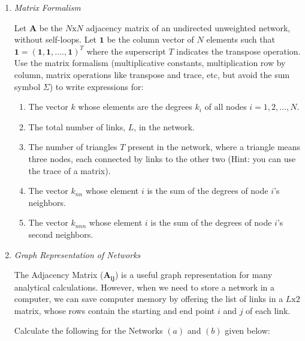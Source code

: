 \documentclass[12pt,letterpaper]{article}
\begin{document}

\bigskip
\bigskip

\begin{enumerate}

\item \textit{Matrix Formalism}

Let $\mathbf{A}$ be the $N\text{x}N$ adjacency matrix of an undirected unweighted network, without self-loops. Let $\mathbf{1}$ be the column vector of $N$ elements such that $\mathbf{1=(1,1,....,1)^\textit{T}}$ where the superscript $T$ indicates the transpose operation. Use the matrix formalism (multiplicative constants, multiplication row by column, matrix operations like transpose and trace, etc, but avoid the sum symbol $\Sigma$) to write expressions for:
\begin{enumerate}
    \item The vector $k$ whose elements are the degrees $k_i$ of all nodes $i = 1, 2,..., N$.
\item The total number of links, $L$, in the network.
\item The number of triangles $T$ present in the network, where a triangle means three nodes, each connected by links to the other two (Hint: you can use the trace of a matrix).
\item The vector $k_{nn}$ whose element $i$ is the sum of the degrees of node $i$'s neighbors.
\item The vector $k_{nnn}$ whose element $i$ is the sum of the degrees of node $i$'s second neighbors.
\end{enumerate}


\item \textit{Graph Representation of Networks}

The Adjacency Matrix ($\mathbf{A_{ij}}$) is a useful graph representation for many analytical calculations. However, when we need to store a network in a computer, we can save computer memory by offering the list of links in a $L\text{x}2$ matrix, whose rows contain the starting and end point $i$ and $j$ of each link. 

Calculate the following for the Networks $(a)$ and $(b)$ given below:


\end{enumerate}
\end{document}
